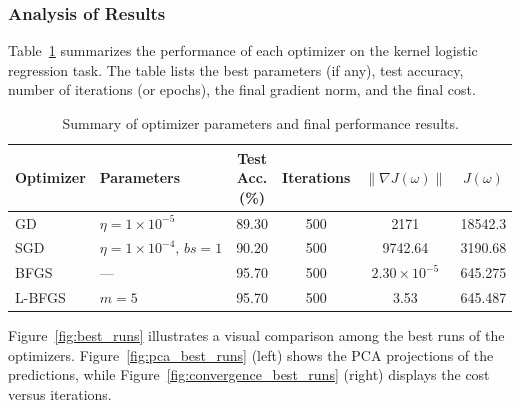 \documentclass{article}
\begin{document}
\subsubsection{Analysis of Results}
Table~\ref{tab:summary_results} summarizes the performance of each optimizer on the kernel logistic regression task. The table lists the best parameters (if any), test accuracy, number of iterations (or epochs), the final gradient norm, and the final cost.
\begin{table}[H]
  \centering
  \begin{tabular}{@{}llcccc@{}}
    \toprule
    \textbf{Optimizer} & \textbf{Parameters} & \textbf{Test Acc. (\%)} & \textbf{Iterations} & \textbf{$\|\nabla J(\omega)\|$} & \textbf{$J(\omega)$} \\ \midrule
    GD     & $\eta = 1\times10^{-5}$             & 89.30 & 500  & 2171      & 18542.3 \\ 
    SGD    & $\eta = 1\times10^{-4},\, bs=1$      & 90.20 & 500  & 9742.64   & 3190.68 \\ 
    BFGS   & ---                               & 95.70 & 500  & $2.30\times10^{-5}$ & 645.275 \\ 
    L-BFGS & $m = 5$                          & 95.70 & 500  & 3.53      & 645.487 \\ \bottomrule
  \end{tabular}
  \caption{Summary of optimizer parameters and final performance results.}
  \label{tab:summary_results}
\end{table}
\noindent Figure~\ref{fig:best_runs} illustrates a visual comparison among the best runs of the optimizers. Figure~\ref{fig:pca_best_runs} (left) shows the PCA projections of the predictions, while Figure~\ref{fig:convergence_best_runs} (right) displays the cost versus iterations.
\end{document}
